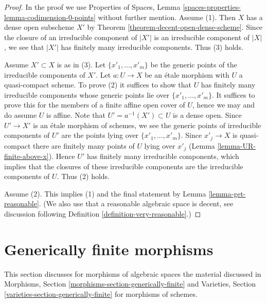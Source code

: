 \documentclass{stacks-project}
\theoremstyle{plain}
\theoremstyle{definition}
\theoremstyle{remark}
\numberwithin{equation}{subsection}
\begin{document}
\begin{proof}
In the proof we use Properties of Spaces, Lemma
\ref{spaces-properties-lemma-codimension-0-points}
without further mention.
Assume (1). Then $X$ has a dense open subscheme $X'$ by
Theorem \ref{theorem-decent-open-dense-scheme}.
Since the closure of an irreducible component of $|X'|$
is an irreducible component of $|X|$, we see that $|X'|$
has finitely many irreducible components. Thus (3) holds.

\medskip\noindent
Assume $X' \subset X$ is as in (3). Let $\{x'_1, \ldots, x'_m\}$
be the generic points of the irreducible components of $X'$.
Let $a : U \to X$ be an \'etale morphism with $U$ a quasi-compact scheme.
To prove (2) it suffices to show that $U$ has
finitely many irreducible components
whose generic points lie over $\{x'_1, \ldots, x'_m\}$. It suffices
to prove this for the members of a finite affine open cover of $U$,
hence we may and do assume $U$ is affine.
Note that $U' = a^{-1}(X') \subset U$ is a dense open.
Since $U' \to X'$ is an \'etale morphism of schemes, we see
the generic points of irreducible components of $U'$ are the points
lying over $\{x'_1, \ldots, x'_m\}$. Since $x'_j \to X$ is
quasi-compact there are finitely many points of $U$ lying over $x'_j$
(Lemma \ref{lemma-UR-finite-above-x}). Hence $U'$ has finitely
many irreducible components, which implies that the closures
of these irreducible components are the irreducible components of
$U$. Thus (2) holds.

\medskip\noindent
Assume (2). This implies (1) and the final
statement by Lemma \ref{lemma-get-reasonable}.
(We also use that a reasonable algebraic space is decent, see
discussion following Definition \ref{definition-very-reasonable}.)
\end{proof}



\section{Generically finite morphisms}
\label{section-generically-finite}

\noindent
This section discusses for morphisms of algebraic spaces the material
discussed in Morphisms, Section \ref{morphisms-section-generically-finite}
and
Varieties, Section \ref{varieties-section-generically-finite}
for morphisms of schemes.
\end{document}
